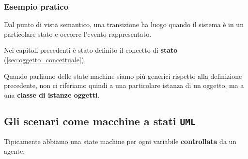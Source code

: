 \subsubsection{Esempio pratico}
\begin{figure}[H]
    \centering
\end{figure}
Dal punto di vista semantico, una transizione ha luogo quando 
il sistema è in un particolare stato e occorre l'evento rappresentato.

Nei capitoli precedenti è stato definito il concetto di \textbf{stato} (\ref{sec:oggetto_concettuale}).

Quando parliamo delle state machine siamo più generici rispetto alla definizione precedente,
non ci riferiamo quindi a una particolare istanza di un oggetto, ma a una 
\textbf{classe di istanze oggetti}.
\subsection{Gli scenari come macchine a stati \texttt{UML}}
Tipicamente abbiamo una state machine per ogni variabile \textbf{controllata} da un agente.


